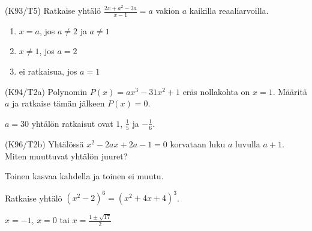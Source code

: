 \begin{tehtavasivu}
\begin{tehtava}
(K93/T5) Ratkaise yhtälö
        $\frac{2x+a^2-3a}{x-1}=a$ vakion $a$ kaikilla reaaliarvoilla.
\begin{vastaus}
        \begin{enumerate}
         \item{$x=a$, jos $a \neq 2$ ja $a \neq 1$}
         \item{$x\neq 1$, jos $a=2$}
         \item{ei ratkaisua, jos $a=1$}
        \end{enumerate}
    \end{vastaus}
\end{tehtava}

\begin{tehtava}
(K94/T2a) Polynomin $P(x)=ax^3-31x^2+1$ eräs nollakohta on $x=1$. Määritä $a$ ja ratkaise tämän jälkeen $P(x)=0$.
\begin{vastaus}
      $a=30$ yhtälön ratkaisut ovat $1$, $\frac{1}{5}$ ja $-\frac{1}{6}$.
    \end{vastaus}
\end{tehtava}

\begin{tehtava}
(K96/T2b) Yhtälössä $x^2-2ax+2a-1=0$ korvataan luku $a$ luvulla $a+1$. Miten muuttuvat yhtälön juuret?
\begin{vastaus}
     Toinen kasvaa kahdella ja toinen ei muutu.
    \end{vastaus}
\end{tehtava}

\begin{tehtava} %
	Ratkaise yhtälö $(x^2-2)^6=(x^2+4x+4)^3$.
	\begin{vastaus}
		$x=-1$, $x=0$ tai $x=\frac{1 \pm \sqrt{17}}{2}$
	\end{vastaus}
\end{tehtava}

\end{tehtavasivu}
